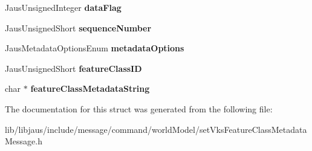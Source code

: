 \begin{DoxyCompactItemize}
\item 
\hypertarget{struct_set_vks_feature_class_metadata_message_struct_a2b31aa323d493a4e35bfabfbec6c37ba}{\-Jaus\-Unsigned\-Integer {\bfseries data\-Flag}}\label{struct_set_vks_feature_class_metadata_message_struct_a2b31aa323d493a4e35bfabfbec6c37ba}

\item 
\hypertarget{struct_set_vks_feature_class_metadata_message_struct_aa5540ad8b0b385953a95c0cac8539ba8}{\-Jaus\-Unsigned\-Short {\bfseries sequence\-Number}}\label{struct_set_vks_feature_class_metadata_message_struct_aa5540ad8b0b385953a95c0cac8539ba8}

\item 
\hypertarget{struct_set_vks_feature_class_metadata_message_struct_af2ced75096ad5d38d1c0666df270d3cf}{\-Jaus\-Metadata\-Options\-Enum {\bfseries metadata\-Options}}\label{struct_set_vks_feature_class_metadata_message_struct_af2ced75096ad5d38d1c0666df270d3cf}

\item 
\hypertarget{struct_set_vks_feature_class_metadata_message_struct_ad32b59790f39951bfbacaa5dff67731b}{\-Jaus\-Unsigned\-Short {\bfseries feature\-Class\-I\-D}}\label{struct_set_vks_feature_class_metadata_message_struct_ad32b59790f39951bfbacaa5dff67731b}

\item 
\hypertarget{struct_set_vks_feature_class_metadata_message_struct_ae20e7048453a6573dee2a2accd510bd7}{char $\ast$ {\bfseries feature\-Class\-Metadata\-String}}\label{struct_set_vks_feature_class_metadata_message_struct_ae20e7048453a6573dee2a2accd510bd7}

\end{DoxyCompactItemize}


\-The documentation for this struct was generated from the following file\-:\begin{DoxyCompactItemize}
\item 
lib/libjaus/include/message/command/world\-Model/set\-Vks\-Feature\-Class\-Metadata\-Message.\-h\end{DoxyCompactItemize}
